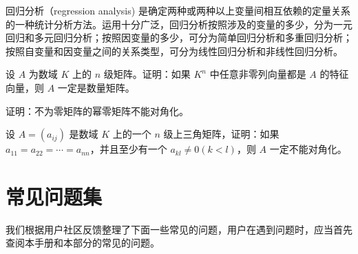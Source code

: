 \documentclass[lang=cn,10pt]{elegantbook}
\begin{document}
\begin{conclusion}
回归分析（regression analysis) 是确定两种或两种以上变量间相互依赖的定量关系的一种统计分析方法。运用十分广泛，回归分析按照涉及的变量的多少，分为一元回归和多元回归分析；按照因变量的多少，可分为简单回归分析和多重回归分析；按照自变量和因变量之间的关系类型，可分为线性回归分析和非线性回归分析。
\end{conclusion}

\begin{problemset}
\item 设 $A$ 为数域 $K$ 上的 $n$ 级矩阵。证明：如果 $K^n$ 中任意非零列向量都是 $A$ 的特征向量，则 $A$ 一定是数量矩阵。
\item 证明：不为零矩阵的幂零矩阵不能对角化。
\item 设 $A = (a_{ij})$ 是数域 $K$ 上的一个 $n$ 级上三角矩阵，证明：如果 $a_{11} = a_{22} = \cdots = a_{nn}$，并且至少有一个 $a_{kl} \not = 0 (k < l)$，则 $A$ 一定不能对角化。
\end{problemset}

\chapter{常见问题集}

我们根据用户社区反馈整理了下面一些常见的问题，用户在遇到问题时，应当首先查阅本手册和本部分的常见的问题。
\end{document}

